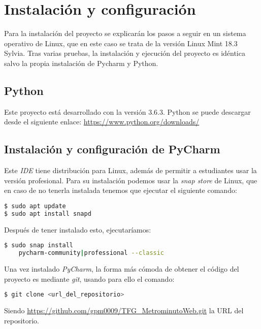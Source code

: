 \section{Instalación y configuración}
Para la instalación del proyecto se explicarán los pasos a seguir en un sistema operativo de Linux, que en este caso se trata de la versión Linux Mint 18.3 Sylvia.
Tras varias pruebas, la instalación y ejecución del proyecto es idéntica salvo la propia instalación de Pycharm y Python.

\subsection{Python}

Este proyecto está desarrollado con la versión 3.6.3. Python se puede descargar desde el siguiente enlace: 
\url{https://www.python.org/downloads/}

\subsection{Instalación y configuración de PyCharm}
Este \textit{IDE} tiene distribución para Linux, además de permitir a estudiantes usar la versión profesional. Para su instalación podemos usar la \textit{snap store} de Linux, que en caso de no tenerla instalada tenemos que ejecutar el siguiente comando:

\renewcommand{\lstlistingname}{Instalar PyCharm}%
\renewcommand{\lstlistlistingname}{List of \lstlistingname s}
\begin{lstlisting}[language=bash,caption={Instalar snapd}]
$ sudo apt update
$ sudo apt install snapd
\end{lstlisting}

Después de tener instalado esto, ejecutaríamos:
\begin{lstlisting}[language=bash,caption={Instalar PyCharm}]
$ sudo snap install 
	pycharm-community|professional --classic
\end{lstlisting}

Una vez instalado \textit{PyCharm}, la forma más cómoda de obtener el código del proyecto es mediante \textit{git}, usando para ello el comando:

\renewcommand{\lstlistingname}{Configurar PyCharm}%
\renewcommand{\lstlistlistingname}{List of \lstlistingname s}
\begin{lstlisting}[language=bash,caption={Descargar el repositorio}]
$ git clone <url_del_repositorio>
\end{lstlisting}
Siendo \url{https://github.com/gpm0009/TFG_MetrominutoWeb.git} la URL del repositorio.

